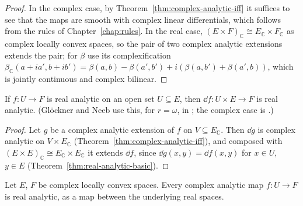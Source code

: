 \begin{proof}
  \leanok
  In the complex case, by Theorem~\ref{thm:complex-analytic-iff} it suffices to see that the maps
  are smooth with complex linear differentials, which follows from the rules of
  Chapter~\ref{chap:rules}. In the real case, $(E \times F)_{\mathbb{C}} \cong E_{\mathbb{C}}
  \times F_{\mathbb{C}}$ as complex locally convex spaces, so the pair of two complex analytic
  extensions extends the pair; for $\beta$ use its complexification
  $\beta_{\mathbb{C}}(a + ia', b + ib') = \beta(a, b) - \beta(a', b') + i(\beta(a, b') +
  \beta(a', b))$, which is jointly continuous and complex bilinear.
\end{proof}

\begin{theorem}
  \label{thm:real-analytic-dMB}
  \leanok
  If $f \colon U \to F$ is real analytic on an open set $U \subseteq E$, then
  $\dd f \colon U \times E \to F$ is real analytic. (Glöckner and Neeb use this, for $r = \omega$,
  in \cite[Lemma~3.3.8(d)]{GN26}; the complex case is \cite[Lemma~2.6]{Glo02}.)
\end{theorem}

\begin{proof}
  \leanok
  Let $g$ be a complex analytic extension of $f$ on $V \subseteq E_{\mathbb{C}}$. Then $\dd g$ is
  complex analytic on $V \times E_{\mathbb{C}}$ (Theorem~\ref{thm:complex-analytic-iff}), and
  composed with $(E \times E)_{\mathbb{C}} \cong E_{\mathbb{C}} \times E_{\mathbb{C}}$ it extends
  $\dd f$, since $\dd g(x, y) = \dd f(x, y)$ for $x \in U$, $y \in E$
  (Theorem~\ref{thm:real-analytic-basic}).
\end{proof}

\begin{proposition}
  \label{prop:complex-real-analytic}
  \leanok
  Let $E$, $F$ be complex locally convex spaces. Every complex analytic map $f \colon U \to F$
  is real analytic, as a map between the underlying real spaces.
\end{proposition}

